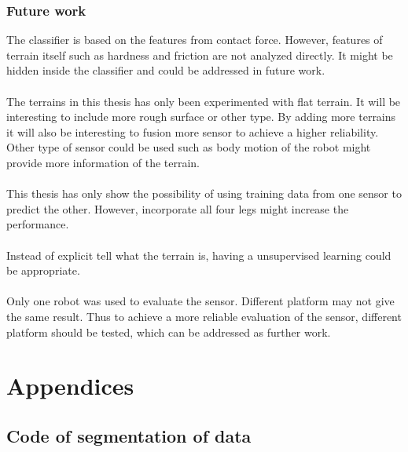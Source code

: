 \documentclass[USenglish]{ifimaster}  %
\begin{document}
\section{Future work}
The classifier is based on the features from contact force. However, features of terrain itself such as hardness and friction are not analyzed directly. It might be hidden inside the classifier and could be addressed in future work. 
\\
\\
The terrains in this thesis has only been experimented with flat terrain. It will be interesting to include more rough surface or other type. By adding more terrains it will also be interesting to fusion more sensor to achieve a higher reliability. Other type of sensor could be used such as body motion of the robot might provide more information of the terrain.  
\\
\\
This thesis has only show the possibility of using training data from one sensor to predict the other. However, incorporate all four legs might increase the performance. 
\\
\\
Instead of explicit tell what the terrain is, having a unsupervised learning could be appropriate. 
\\
\\
Only one robot was used to evaluate the sensor. Different platform may not give the same result. Thus to achieve a more reliable evaluation of the sensor, different platform should be tested, which can be addressed as further work.
	
	


\part*{Appendices} 
\appendix
\chapter{Code of segmentation of data} \label{ap:code}

\end{document}
